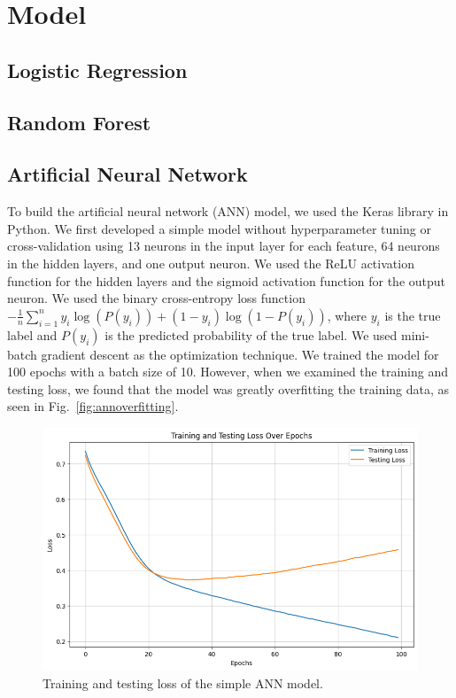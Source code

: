 \section{Model}

\subsection{Logistic Regression}

\subsection{Random Forest}

\subsection{Artificial Neural Network}

To build the artificial neural network (ANN) model, we used the Keras library in Python. We first developed a simple model without hyperparameter tuning or cross-validation using 13 neurons in the input layer for each feature, 64 neurons in the hidden layers, and one output neuron. We used the ReLU activation function for the hidden layers and the sigmoid activation function for the output neuron. We used the binary cross-entropy loss function \(-\frac{1}{n}\sum_{i=1}^{n}y_i \log (P(y_i)) + (1 - y_i) \log (1 - P(y_i))\), where \(y_i\) is the true label and \(P(y_i)\) is the predicted probability of the true label.
We used mini-batch gradient descent as the optimization technique. We trained the model for 100 epochs with a batch size of 10. However, when we examined the training and testing loss, we found that the model was greatly overfitting the training data, as seen in Fig.~\ref{fig:annoverfitting}. 

\begin{figure}[htbp]
    \centerline{\includegraphics[width=0.7\columnwidth]{img/annoverfitting.png}}
    \caption{Training and testing loss of the simple ANN model.}\label{annoverfitting}
\end{figure}

